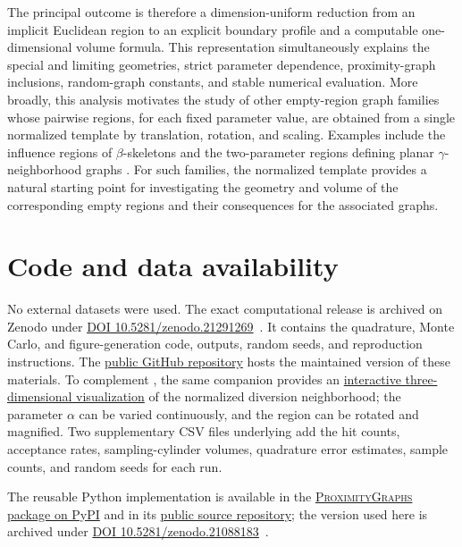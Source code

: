 \documentclass[a4paper,fleqn]{cas-dc}
\theoremstyle{definition}
\theoremstyle{remark}
\newcommand{\0}{\mathbf{0}}
\begin{document}
The principal outcome is therefore a dimension-uniform reduction from an
implicit Euclidean region to an explicit boundary profile and a computable
one-dimensional volume formula. This representation simultaneously explains
the special and limiting geometries, strict parameter dependence,
proximity-graph inclusions, random-graph constants, and stable numerical
evaluation. More broadly, this analysis motivates the study of other
empty-region graph families whose pairwise regions, for each fixed parameter
value, are obtained from a single normalized template by translation,
rotation, and scaling. 
Examples include the influence regions of $\beta$-skeletons
\citep{kirkpatrick1985framework} and the two-parameter regions defining
planar $\gamma$-neighborhood graphs \citep{veltkamp1992gamma}.
For such families, the normalized template
provides a natural starting point for investigating the geometry and volume
of the corresponding empty regions and their consequences for the associated
graphs.

\printcredits

\section*{Code and data availability}
No external datasets were used. The exact computational release is archived
on Zenodo under
\href{https://doi.org/10.5281/zenodo.21291269}{DOI
10.5281/zenodo.21291269}~\citep{espino2026computational}. It contains the
quadrature, Monte Carlo, and figure-generation code, outputs, random seeds, and
reproduction instructions. The
\href{https://github.com/heri-espino/Stepping-Stone-Volume-Constants}{public
GitHub repository} hosts the maintained version of these materials. To
complement , the same companion provides an
\href{https://heri-espino.github.io/Stepping-Stone-Volume-Constants/}{interactive
three-dimensional visualization} of the normalized diversion neighborhood;
the parameter $\alpha$ can be varied continuously, and the region can be
rotated and magnified. Two supplementary CSV files underlying
 add the hit counts, acceptance rates, sampling-cylinder
volumes, quadrature error estimates, sample counts, and random seeds for each
run.



    The reusable Python implementation is available in the
\href{https://pypi.org/project/proximitygraphs/}{\textsc{ProximityGraphs}
package on PyPI} and in its
\href{https://github.com/HectorMaravillo/ProximityGraphs}{public source
repository}; the version used here is archived under
\href{https://doi.org/10.5281/zenodo.21088183}{DOI
10.5281/zenodo.21088183}~\citep{maravillo2026proximitygraphs}.
\end{document}
